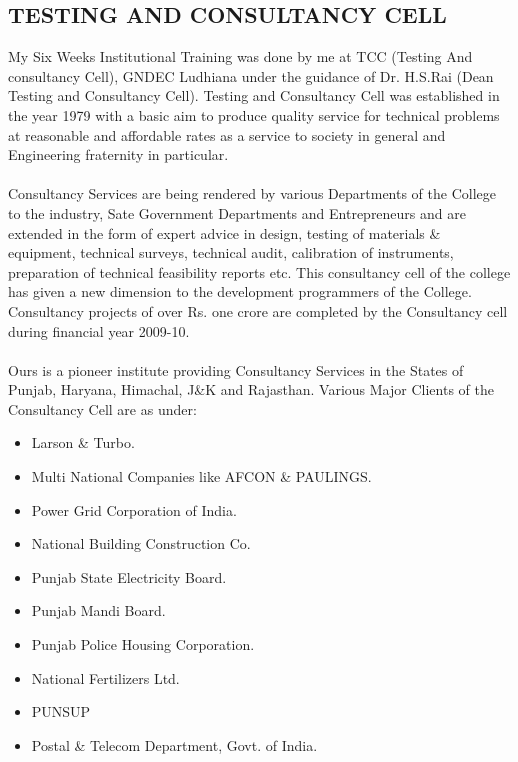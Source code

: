 \subsection{TESTING AND CONSULTANCY CELL}
My Six Weeks Institutional Training was done by me at TCC (Testing And consultancy Cell),
GNDEC Ludhiana under the guidance of Dr. H.S.Rai (Dean Testing and Consultancy Cell).
Testing and Consultancy Cell was established in the year 1979 with a basic aim to produce
quality service for technical problems at reasonable and affordable rates as a service to society
in general and Engineering fraternity in particular.\\ \\
Consultancy Services are being rendered by various Departments of the College to the
industry, Sate Government Departments and Entrepreneurs and are extended in the form of
expert advice in design, testing of materials \& equipment, technical surveys, technical audit,
calibration of instruments, preparation of technical feasibility reports etc.
This consultancy cell of the college has given a new dimension to the development
programmers of the College. Consultancy projects of over Rs. one crore are completed by the
Consultancy cell during financial year 2009-10. \\ \\
Ours is a pioneer institute providing Consultancy Services in the States of Punjab, Haryana,
Himachal, J\&K and Rajasthan. Various Major Clients of the Consultancy Cell are as under:\\
\begin{itemize}
\item Larson \& Turbo.
\item Multi National Companies like AFCON \& PAULINGS.
\item Power Grid Corporation of India.
\item National Building Construction Co.
\item Punjab State Electricity Board.
\item Punjab Mandi Board.
\item Punjab Police Housing Corporation.
\item National Fertilizers Ltd.
\item PUNSUP
\item Postal \& Telecom Department, Govt. of India.
\end{itemize}

